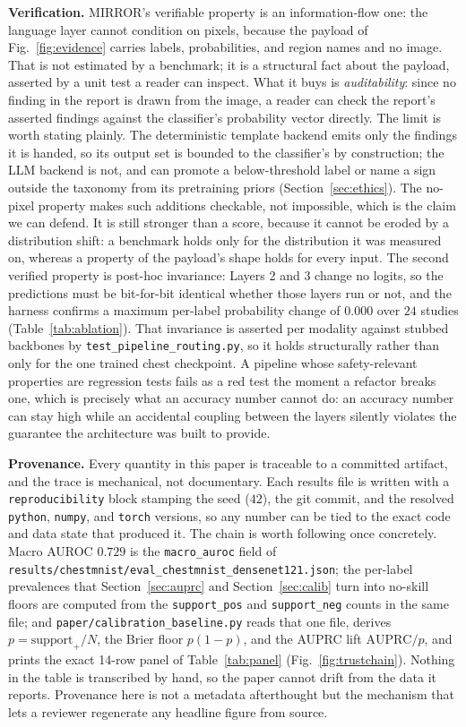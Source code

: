 \documentclass[conference]{IEEEtran}
\newcommand{\code}[1]{\texttt{\small #1}}
\newcommand{\rih}[1]{\textbf{#1}\enspace\ignorespaces}
\begin{document}
\rih{Verification.} MIRROR's verifiable property is an information-flow one: the
language layer cannot condition on pixels, because the payload of
Fig.~\ref{fig:evidence} carries labels, probabilities, and region names and no image.
That is not estimated by a benchmark; it is a structural fact about the payload,
asserted by a unit test a reader can inspect. What it buys is \emph{auditability}:
since no finding in the report is drawn from the image, a reader can check the
report's asserted findings against the classifier's probability vector directly. The
limit is worth stating plainly. The deterministic template backend emits only the
findings it is handed, so its output set is bounded to the classifier's by
construction; the LLM backend is not, and can promote a below-threshold label or name
a sign outside the taxonomy from its pretraining priors (Section~\ref{sec:ethics}).
The no-pixel property makes such additions checkable, not impossible, which is the
claim we can defend. It is still stronger than a score, because it cannot be eroded
by a distribution shift: a benchmark holds only for the distribution it was measured
on, whereas a property of the payload's shape holds for every input. The second
verified property is post-hoc invariance: Layers 2 and 3 change no logits, so the
predictions must be bit-for-bit identical whether those layers run or not, and the
harness confirms a maximum per-label probability change of $0.000$ over $24$ studies
(Table~\ref{tab:ablation}). That invariance is asserted per modality against stubbed
backbones by \code{test\_pipeline\_routing.py}, so it holds structurally rather than
only for the one trained chest checkpoint. A pipeline whose safety-relevant
properties are regression tests fails as a red test the moment a refactor breaks
one, which is precisely what an accuracy number cannot do: an accuracy number can
stay high while an accidental coupling between the layers silently violates the
guarantee the architecture was built to provide.

\rih{Provenance.} Every quantity in this paper is traceable to a committed artifact,
and the trace is mechanical, not documentary. Each results file is written with a
\code{reproducibility} block stamping the seed ($42$), the git commit, and the
resolved \texttt{python}, \texttt{numpy}, and \texttt{torch} versions, so any number
can be tied to the exact code and data state that produced it. The chain is worth
following once concretely. Macro AUROC $0.729$ is the \code{macro\_auroc} field of
\code{results/chestmnist/eval\_chestmnist\_densenet121.json}; the per-label
prevalences that Section~\ref{sec:auprc} and Section~\ref{sec:calib} turn into
no-skill floors are computed from the \code{support\_pos} and \code{support\_neg}
counts in the same file; and \code{paper/calibration\_baseline.py} reads that one
file, derives $p=\text{support}_+/N$, the Brier floor $p(1-p)$, and the AUPRC lift
$\text{AUPRC}/p$, and prints the exact 14-row panel of Table~\ref{tab:panel}
(Fig.~\ref{fig:trustchain}). Nothing in the table is transcribed by hand, so the
paper cannot drift from the data it reports. Provenance here is not a metadata
afterthought but the mechanism that lets a reviewer regenerate any headline figure
from source.
\end{document}
